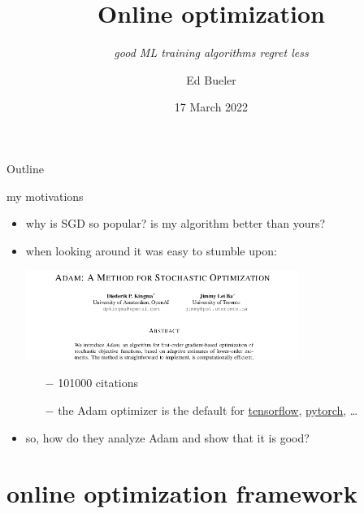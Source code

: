 \documentclass[xcolor={svgnames},
               hyperref={colorlinks,citecolor=DeepPink4,linkcolor=FireBrick,urlcolor=Maroon}]
               {beamer}
\title{Online optimization}
\subtitle{\emph{good ML training algorithms regret less}}
\author{Ed Bueler}
\institute[UAF]{MATH 692 Mathematics for Machine Learning}
\date[]{17 March 2022}
\begin{document}
\beamertemplatenavigationsymbolsempty

\begin{frame}
  \maketitle
\end{frame}


\begin{frame}{Outline}
  \tableofcontents[hideallsubsections]
\end{frame}


\begin{frame}{my motivations}

\begin{itemize}
\item why is SGD so popular? is my algorithm better than yours?

\medskip
\item when looking around it was easy to stumble upon:

\medskip
\begin{center}
\includegraphics[width=0.7\textwidth]{figs/adam-paper.png}
\end{center}

\medskip
    \begin{itemize}
    \item[$-$] 101000 citations
    \item[$-$] the Adam optimizer is the default for \href{https://www.tensorflow.org/tutorials/keras/classification}{tensorflow}, \href{https://pytorch.org/docs/stable/optim.html}{pytorch}, \dots
    \end{itemize}

\medskip
\item so, how do they analyze Adam and show that it is good?
\end{itemize}
\end{frame}


\section{online optimization framework}
\end{document}
